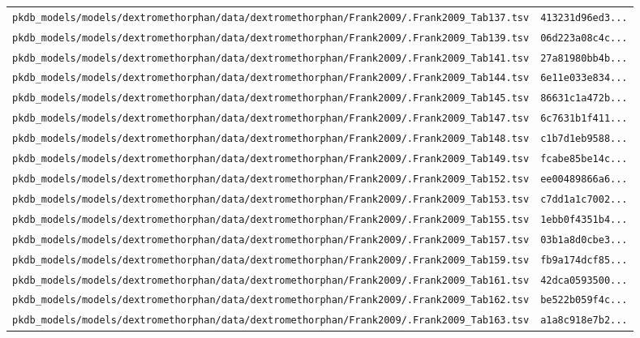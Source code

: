 \documentclass{article}
\begin{document}
\begin{longtable}{ll}
\texttt{pkdb\_models/models/dextromethorphan/data/dextromethorphan/Frank2009/.Frank2009\_Tab137.tsv} & \texttt{413231d96ed3...} \\
\texttt{pkdb\_models/models/dextromethorphan/data/dextromethorphan/Frank2009/.Frank2009\_Tab139.tsv} & \texttt{06d223a08c4c...} \\
\texttt{pkdb\_models/models/dextromethorphan/data/dextromethorphan/Frank2009/.Frank2009\_Tab141.tsv} & \texttt{27a81980bb4b...} \\
\texttt{pkdb\_models/models/dextromethorphan/data/dextromethorphan/Frank2009/.Frank2009\_Tab144.tsv} & \texttt{6e11e033e834...} \\
\texttt{pkdb\_models/models/dextromethorphan/data/dextromethorphan/Frank2009/.Frank2009\_Tab145.tsv} & \texttt{86631c1a472b...} \\
\texttt{pkdb\_models/models/dextromethorphan/data/dextromethorphan/Frank2009/.Frank2009\_Tab147.tsv} & \texttt{6c7631b1f411...} \\
\texttt{pkdb\_models/models/dextromethorphan/data/dextromethorphan/Frank2009/.Frank2009\_Tab148.tsv} & \texttt{c1b7d1eb9588...} \\
\texttt{pkdb\_models/models/dextromethorphan/data/dextromethorphan/Frank2009/.Frank2009\_Tab149.tsv} & \texttt{fcabe85be14c...} \\
\texttt{pkdb\_models/models/dextromethorphan/data/dextromethorphan/Frank2009/.Frank2009\_Tab152.tsv} & \texttt{ee00489866a6...} \\
\texttt{pkdb\_models/models/dextromethorphan/data/dextromethorphan/Frank2009/.Frank2009\_Tab153.tsv} & \texttt{c7dd1a1c7002...} \\
\texttt{pkdb\_models/models/dextromethorphan/data/dextromethorphan/Frank2009/.Frank2009\_Tab155.tsv} & \texttt{1ebb0f4351b4...} \\
\texttt{pkdb\_models/models/dextromethorphan/data/dextromethorphan/Frank2009/.Frank2009\_Tab157.tsv} & \texttt{03b1a8d0cbe3...} \\
\texttt{pkdb\_models/models/dextromethorphan/data/dextromethorphan/Frank2009/.Frank2009\_Tab159.tsv} & \texttt{fb9a174dcf85...} \\
\texttt{pkdb\_models/models/dextromethorphan/data/dextromethorphan/Frank2009/.Frank2009\_Tab161.tsv} & \texttt{42dca0593500...} \\
\texttt{pkdb\_models/models/dextromethorphan/data/dextromethorphan/Frank2009/.Frank2009\_Tab162.tsv} & \texttt{be522b059f4c...} \\
\texttt{pkdb\_models/models/dextromethorphan/data/dextromethorphan/Frank2009/.Frank2009\_Tab163.tsv} & \texttt{a1a8c918e7b2...} \\

\end{longtable}
\end{document}
